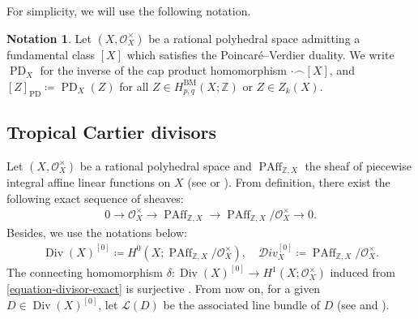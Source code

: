 \documentclass[a4paper,dvipdfmx,reqno,12pt]{amsart}
\theoremstyle{definition}
\newtheorem{notation}[theorem]{Notation}
\newcommand{\deq}{\coloneqq}
\newcommand{\opn}[1]{\operatorname{#1}}
\newcommand{\PD}[1]{[#1]_{\mathrm{PD}}}
\numberwithin{equation}{section}
\begin{document}
For simplicity, we will use the following notation.
\begin{notation}
Let $(X,\mathcal{O}_X^{\times})$ be
a rational polyhedral space admitting
a fundamental class $[X]$ which satisfies
the Poincar\'e--Verdier duality.
We write $\opn{PD}_X$ for the inverse of
the cap product homomorphism $\cdot \frown [X]$,
and $\PD{Z}\deq \opn{PD}_X(Z)$ for all 
$Z\in H^{\mathrm{BM}}_{p,q}(X;\mathbb{Z})$ or 
$Z\in Z_{k}(X)$.
\end{notation}




\subsection{Tropical Cartier divisors}
Let 
$(X,\mathcal{O}_X^{\times})$ be a rational polyhedral space
and $\opn{PAff}_{\mathbb{Z},X}$ the sheaf
of piecewise integral affine linear functions
on $X$
(see \cite[Definition 4.1]{MR3894860}
or \cite[Definition 3.8 and Remark
3.9]{MR4637248}).
From definition, there exist the following
exact sequence of sheaves:
\begin{align}
\label{equation-divisor-exact}
0 \to  \mathcal{O}_X^{\times} 
\to \opn{PAff}_{\mathbb{Z},X} \to 
\opn{PAff}_{\mathbb{Z},X}/\mathcal{O}_X^{\times}
\to 0.
\end{align}
Besides, we use the notations below:
\begin{align}
\opn{Div}(X)^{[0]}\deq H^{0}(X;
\opn{PAff}_{\mathbb{Z},X}/\mathcal{O}_X^{\times}), 
\quad \mathcal{D}iv_X^{[0]}\deq
\opn{PAff}_{\mathbb{Z},X}/\mathcal{O}_X^{\times}.
\end{align}
The connecting homomorphism 
$\delta \colon \opn{Div}(X)^{[0]}\to 
H^{1}(X;\mathcal{O}_X^{\times})$
induced from \eqref{equation-divisor-exact}
is surjective \cite[Proposition 4.6]{MR3894860}.
From now on, for a given $D\in \opn{Div}(X)^{[0]}$,
let $\mathcal{L}(D)$ be the associated
line bundle of $D$
(see \cite[]{MR4637248} and 
\cite[]{MR2457739}).
\end{document}
